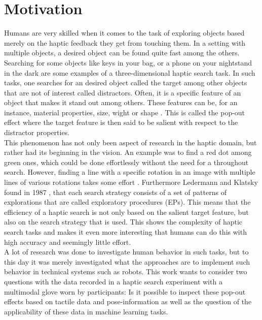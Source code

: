 \section{Motivation}
Humans are very skilled when it comes to the task of exploring objects based merely on the haptic feedback they get from touching them. In a setting with multiple objects, a desired object can be found quite fast among the others. Searching for some objects like keys in your bag, or a phone on your nightstand in the dark are some examples of a three-dimensional haptic search task. In such tasks, one searches for an desired object called the target among other objects that are not of interest called distractors. Often, it is a specific feature of an object that makes it stand out among others. These features can be, for an instance, material properties, size, wight or shape \cite{HapticShape}. This is called the pop-out effect where the target feature is then said to be salient with respect to the distractor properties. \\
This phenomenon has not only been aspect of research in the haptic domain, but rather had its beginning in the vision. An example was to find a red dot among green ones, which could be done effortlessly without the need for a throughout search. However, finding a line with a specific rotation in an image with multiple lines of various rotations takes some effort \cite{treisman_gormican_1988}. Furthermore Ledermann and Klatsky found in 1987 \cite{EPs}, that each search strategy consists of a set of patterns of explorations that are called exploratory procedures (EPs). This means that the efficiency of a haptic search is not only based on the salient target feature, but also on the search strategy that is used. This shows the complexity of haptic search tasks and makes it even more interesting that humans can do this with high accuracy and seemingly little effort.  \\
A lot of research was done to investigate human behavior in such tasks, but to this day it was merely investigated what the approaches are to implement such behavior in technical systems such as robots. This work wants to consider two questions with the data recorded in a haptic search experiment with a multimodal glove worn by participants: Is it possible to inspect these pop-out effects based on tactile data and pose-information as well as the question of the applicability of these data in machine learning tasks. 

